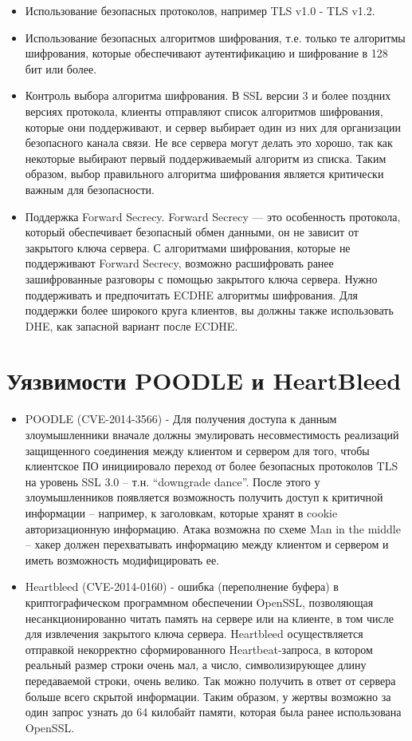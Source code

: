 \documentclass[10pt,a4paper]{report}
\begin{document}
\begin{itemize}
			\item Использование безопасных протоколов, например TLS v1.0 - TLS v1.2.
			
			\item Использование безопасных алгоритмов шифрования, т.е. только те алгоритмы шифрования, которые обеспечивают аутентификацию и шифрование в 128 бит или более.
			
			\item Контроль выбора алгоритма шифрования.
			В SSL версии 3 и более поздних версиях протокола, клиенты отправляют 
			список алгоритмов шифрования, которые они поддерживают, и сервер выбирает 
			один из них для организации безопасного канала связи.
			Не все сервера могут делать это хорошо, так как некоторые выбирают первый 
			поддерживаемый алгоритм из списка.
			Таким образом, выбор правильного алгоритма шифрования является критически 
			важным для безопасности.
			
			\item Поддержка Forward Secrecy.
			Forward Secrecy — это особенность протокола, который обеспечивает 
			безопасный обмен данными, он не зависит от закрытого ключа сервера.
			С алгоритмами шифрования, которые не поддерживают Forward Secrecy, 
			возможно расшифровать ранее зашифрованные разговоры с помощью закрытого 
			ключа сервера.
			Нужно поддерживать и предпочитать ECDHE алгоритмы шифрования.
			Для поддержки более широкого круга клиентов, вы должны также использовать 
			DHE, как запасной вариант после ECDHE.
		\end{itemize}
	\section{Уязвимости POODLE и HeartBleed}
		\begin{itemize}
			\item POODLE (CVE-2014-3566) - Для получения доступа к данным злоумышленники вначале должны эмулировать несовместимость реализаций защищенного соединения между клиентом и сервером для того, чтобы клиентское ПО инициировало переход от более безопасных протоколов TLS на уровень SSL 3.0 – т.н. “downgrade dance”. После этого у злоумышленников появляется возможность получить доступ к критичной информации – например, к заголовкам, которые хранят в cookie авторизационную информацию. Атака возможна по схеме Man in the middle – хакер должен перехватывать информацию между клиентом и сервером и иметь возможность модифицировать ее.
			
			\item Heartbleed (CVE-2014-0160) - ошибка (переполнение буфера) в 
			криптографическом программном обеспечении OpenSSL, позволяющая 
			несанкционированно читать память на сервере или на клиенте, в том числе 
			для извлечения закрытого ключа сервера. 
			Heartbleed осуществляется отправкой некорректно сформированного 
			Heartbeat-запроса, в котором реальный размер строки очень мал, а число, 
			символизирующее длину передаваемой строки, очень велико.
			Так можно получить в ответ от сервера больше всего скрытой информации.
			Таким образом, у жертвы возможно за один запрос узнать до 64 килобайт 
			памяти, которая была ранее использована OpenSSL.
		\end{itemize}
	
\end{document}
